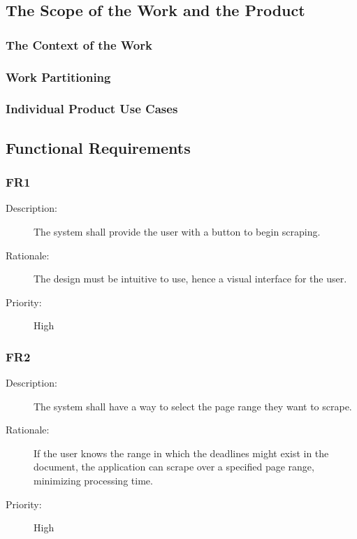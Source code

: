 \documentclass[12pt, titlepage]{article}
\begin{document}
\subsection{The Scope of the Work and the Product}

\subsubsection{The Context of the Work}

\subsubsection{Work Partitioning}

\subsubsection{Individual Product Use Cases}

\subsection{Functional Requirements}

\subsubsection{FR1}

\begin{description}
  \item[Description:] The system shall provide the user with a button to begin scraping. 
  \item[Rationale:] The design must be intuitive to use, hence a visual interface for the user. 
  \item[Priority:] High
\end{description}

\subsubsection{FR2}

\begin{description}
  \item[Description:] The system shall have a way to select the page range they want to scrape. 
  \item[Rationale:] If the user knows the range in which the deadlines might exist in the document, the application can scrape over a specified page range, minimizing processing time. 
  \item[Priority:] High
\end{description}
\end{document}

